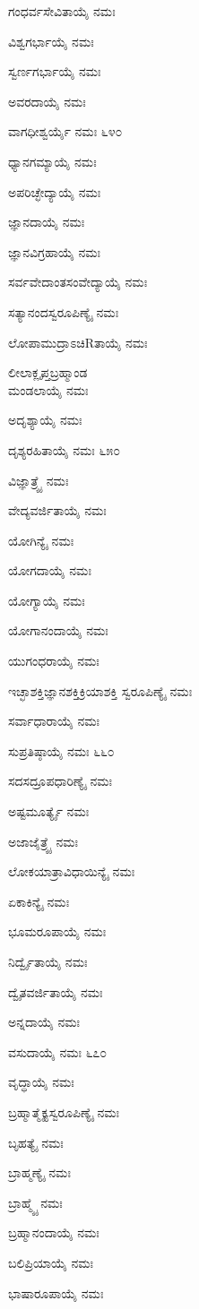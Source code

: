 ಗಂಧರ್ವಸೇವಿತಾಯೈ ನಮಃ

ವಿಶ್ವಗರ್ಭಾಯೈ ನಮಃ

ಸ್ವರ್ಣಗರ್ಭಾಯೈ ನಮಃ

ಅವರದಾಯೈ ನಮಃ

ವಾಗಧೀಶ್ವರ್ಯೈ ನಮಃ \num{೬೪೦}

ಧ್ಯಾನಗಮ್ಯಾಯೈ ನಮಃ

ಅಪರಿಚ್ಛೇದ್ಯಾಯೈ ನಮಃ

ಜ್ಞಾನದಾಯೈ ನಮಃ

ಜ್ಞಾನವಿಗ್ರಹಾಯೈ ನಮಃ

ಸರ್ವವೇದಾಂತಸಂವೇದ್ಯಾಯೈ ನಮಃ

ಸತ್ಯಾನಂದಸ್ವರೂಪಿಣ್ಯೈ ನಮಃ

ಲೋಪಾಮುದ್ರಾಽಚಿRತಾಯೈ ನಮಃ

ಲೀಲಾಕ್ಲೃಪ್ತಬ್ರಹ್ಮಾಂಡ\\ಮಂಡಲಾಯೈ ನಮಃ

ಅದೃಶ್ಯಾಯೈ ನಮಃ

ದೃಶ್ಯರಹಿತಾಯೈ ನಮಃ \num{೬೫೦}

ವಿಜ್ಞಾತ್ರ್ಯೈ ನಮಃ

ವೇದ್ಯವರ್ಜಿತಾಯೈ ನಮಃ

ಯೋಗಿನ್ಯೈ ನಮಃ

ಯೋಗದಾಯೈ ನಮಃ

ಯೋಗ್ಯಾಯೈ ನಮಃ

ಯೋಗಾನಂದಾಯೈ ನಮಃ

ಯುಗಂಧರಾಯೈ ನಮಃ

ಇಚ್ಛಾಶಕ್ತಿಜ್ಞಾನಶಕ್ತಿಕ್ರಿಯಾಶಕ್ತಿ ಸ್ವರೂಪಿಣ್ಯೈ ನಮಃ

ಸರ್ವಾಧಾರಾಯೈ ನಮಃ

ಸುಪ್ರತಿಷ್ಠಾಯೈ ನಮಃ \num{೬೬೦}

ಸದಸದ್ರೂಪಧಾರಿಣ್ಯೈ ನಮಃ

ಅಷ್ಟಮೂರ್ತ್ಯೈ ನಮಃ

ಅಜಾಜೈತ್ರ್ಯೈ ನಮಃ

ಲೋಕಯಾತ್ರಾವಿಧಾಯಿನ್ಯೈ ನಮಃ

ಏಕಾಕಿನ್ಯೈ ನಮಃ

ಭೂಮರೂಪಾಯೈ ನಮಃ

ನಿರ್ದ್ವೈತಾಯೈ ನಮಃ

ದ್ವೈತವರ್ಜಿತಾಯೈ ನಮಃ

ಅನ್ನದಾಯೈ ನಮಃ

ವಸುದಾಯೈ ನಮಃ \num{೬೭೦}

ವೃದ್ಧಾಯೈ ನಮಃ

ಬ್ರಹ್ಮಾತ್ಮೈಕ್ಯಸ್ವರೂಪಿಣ್ಯೈ ನಮಃ

ಬೃಹತ್ಯೈ ನಮಃ

ಬ್ರಾಹ್ಮಣ್ಯೈ ನಮಃ

ಬ್ರಾಹ್ಮ್ಯೈ ನಮಃ

ಬ್ರಹ್ಮಾನಂದಾಯೈ ನಮಃ

ಬಲಿಪ್ರಿಯಾಯೈ ನಮಃ

ಭಾಷಾರೂಪಾಯೈ ನಮಃ

